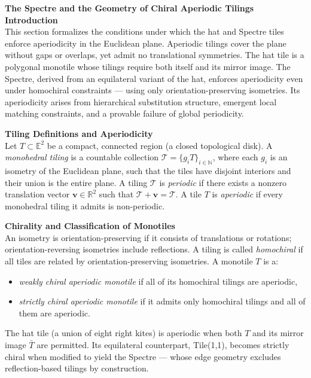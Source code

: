 \begin{technical}
{\Large\textbf{The Spectre and the Geometry of Chiral Aperiodic Tilings}}\\[0.7em]

\textbf{Introduction}\\[0.5em]
This section formalizes the conditions under which the hat and Spectre tiles enforce aperiodicity in the Euclidean plane. Aperiodic tilings cover the plane without gaps or overlaps, yet admit no translational symmetries. The hat tile is a polygonal monotile whose tilings require both itself and its mirror image. The Spectre, derived from an equilateral variant of the hat, enforces aperiodicity even under homochiral constraints — using only orientation-preserving isometries. Its aperiodicity arises from hierarchical substitution structure, emergent local matching constraints, and a provable failure of global periodicity.

\textbf{Tiling Definitions and Aperiodicity}\\[0.5em]
Let \( T \subset \mathbb{E}^2 \) be a compact, connected region (a closed topological disk). A \emph{monohedral tiling} is a countable collection \( \mathcal{T} = \{g_i T\}_{i \in \mathbb{N}} \), where each \( g_i \) is an isometry of the Euclidean plane, such that the tiles have disjoint interiors and their union is the entire plane. A tiling \( \mathcal{T} \) is \emph{periodic} if there exists a nonzero translation vector \( \mathbf{v} \in \mathbb{R}^2 \) such that \( \mathcal{T} + \mathbf{v} = \mathcal{T} \). A tile \( T \) is \emph{aperiodic} if every monohedral tiling it admits is non-periodic.

\textbf{Chirality and Classification of Monotiles}\\[0.5em]
An isometry is orientation-preserving if it consists of translations or rotations; orientation-reversing isometries include reflections. A tiling is called \emph{homochiral} if all tiles are related by orientation-preserving isometries. A monotile \( T \) is a:
\begin{itemize}
\item \emph{weakly chiral aperiodic monotile} if all of its homochiral tilings are aperiodic,
\item \emph{strictly chiral aperiodic monotile} if it admits only homochiral tilings and all of them are aperiodic.
\end{itemize}
The hat tile (a union of eight right kites) is aperiodic when both \( T \) and its mirror image \( \bar{T} \) are permitted. Its equilateral counterpart, Tile(1,1), becomes strictly chiral when modified to yield the Spectre — whose edge geometry excludes reflection-based tilings by construction.


\end{technical}
